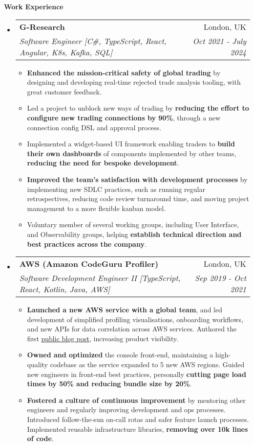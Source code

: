 \documentclass[letterpaper,11pt]{article}
\makeatletter
\newcommand{\resitem}[1]{\item #1 \vspace{-1pt}}
\newcommand{\resheading}[1]{{\large \colorbox{mygrey}{\begin{minipage}{\textwidth}{\textbf{#1 \vphantom{p\^{E}}}}\end{minipage}}}}
\newcommand{\ressubheading}[4]{
\begin{tabular*}{7.0in}{l@{\extracolsep{\fill}}r}
	\textbf{#1} & #2 \\
	\textit{#3} & \textit{#4} \\
\end{tabular*}\vspace{-6pt}}
\makeatother
\begin{document}
\resheading{Work Experience}
\begin{itemize}
	\item
	\ressubheading{G-Research}{London, UK}{Software Engineer [C\#, TypeScript, React, Angular, K8s, Kafka, SQL]}{Oct 2021 - July 2024}
	\begin{itemize}
		\resitem{\textbf{Enhanced the mission-critical safety of global trading} by designing and developing real-time rejected trade analysis tooling, with great customer feedback.}
		\resitem{Led a project to unblock new ways of trading by \textbf{reducing the effort to configure new trading connections by 90\%}, through a new connection config DSL and approval process.}
		\resitem{Implemented a widget-based UI framework enabling traders to \textbf{build their own dashboards} of components implemented by other teams, \textbf{reducing the need for bespoke development}.}
		\resitem{\textbf{Improved the team's satisfaction with development processes} by implementing new SDLC practices, such as running regular retrospectives, reducing code review turnaround time, and moving project management to a more flexible kanban model.}
		\resitem{Voluntary member of several working groups, including User Interface, and Observability groups, helping \textbf{establish technical direction and best practices across the company}.}
	\end{itemize}

	\item
	\ressubheading{AWS (Amazon CodeGuru Profiler)}{London, UK}{Software Development Engineer II [TypeScript, React, Kotlin, Java, AWS]}{Sep 2019 - Oct 2021}
	\begin{itemize}
		\resitem{\textbf{Launched a new AWS service with a global team}, and led development of simplified profiling visualisations, onboarding workflows, and new APIs for data correlation across AWS services. Authored the first \href{https://aws.amazon.com/blogs/machine-learning/optimizing-application-performance-with-amazon-codeguru-profiler/}{public blog post}, increasing product visibility.}
		\resitem{\textbf{Owned and optimized} the console front-end, maintaining a high-quality codebase as the service expanded to 5 new AWS regions. Guided new engineers in front-end best practices, personally \textbf{cutting page load times by 50\% and reducing bundle size by 20\%}.}
		\resitem{\textbf{Fostered a culture of continuous improvement} by mentoring other engineers and regularly improving development and ops processes. Introduced follow-the-sun on-call rotas and safer feature launch processes. Implemented reusable infrastructure libraries, \textbf{removing over 10k lines of code}.}
	\end{itemize}


\end{itemize}
\end{document}

